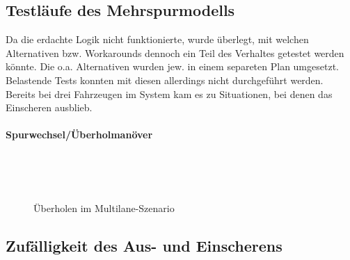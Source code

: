 


\subsection{Testläufe des Mehrspurmodells}
\label{test-multilane}

Da die erdachte Logik nicht funktionierte, wurde überlegt, mit welchen Alternativen bzw. Workarounds dennoch ein Teil des Verhaltes getestet werden könnte.
Die o.a. Alternativen wurden jew. in einem separeten Plan umgesetzt.
Belastende Tests konnten mit diesen allerdings nicht durchgeführt werden.
\\
Bereits bei drei Fahrzeugen im System kam es zu Situationen, bei denen das Einscheren ausblieb.

\paragraph*{Spurwechsel/Überholmanöver}
\hfill \\
\begin{figure}[hptb]
  \centering 
   \qquad 
    \\ 
  \caption{Überholen im Multilane-Szenario} 
  \label{figure:multi-overtake}
\end{figure}






\subsection{Zufälligkeit des Aus- und Einscherens}
\label{sec:additional-extensions}



